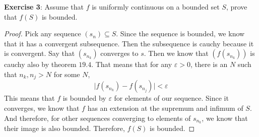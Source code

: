 \documentclass{article}
\begin{document}
\textbf{Exercise 3}: Assume that $f$ is uniformly continuous on a bounded set $S$, prove that $f(S)$ is bounded.
    \begin{proof}
        Pick any sequence $(s_{n}) \subseteq S$. Since the sequence is bounded, we know that it has a convergent subsequence. Then the subsequence is cauchy because it is convergent. Say that $(s_{n_{k}})$ converges to $s$. Then we know that $(f(s_{n_{k}}))$ is cauchy also by theorem $19.4$. That means that for any $\varepsilon> 0$, there is an $N$ such that $n_{k}, n_{j} > N$ for some $N$, 
            \begin{equation*}
                \lvert f(s_{n_{k}}) - f(s_{n_{j}}) \rvert < \varepsilon
            \end{equation*}
        This means that $f$ is bounded by $\varepsilon$ for elements of our sequence. Since it converges, we know that $f$ has an extension at the supremum and infimum of $S$. And therefore, for other sequences converging to elements of $s_{n_{k}}$, we know that their image is also bounded. Therefore, $f(S)$ is bounded.
    \end{proof}
\end{document}
